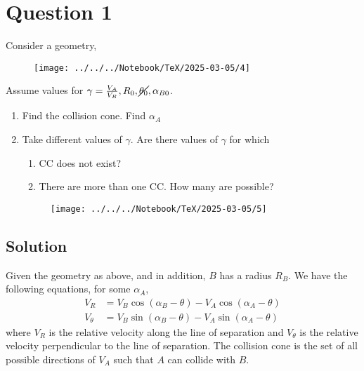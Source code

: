 \section*{Question 1}

Consider a geometry,
\vspace*{-1.5em}
\begin{figure}[htbp]
      \centering
      \texttt{[image: ../../../Notebook/TeX/2025-03-05/4]}
\end{figure}
\vspace*{-1.5em}
Assume values for \( \gamma = \frac{V_A}{V_B}, R_0, \cancel{\theta_0}, \alpha_{B0} \).
\begin{enumerate}[label= (\alph*), noitemsep, topsep=0pt]
      \item Find the collision cone.
            Find \( \alpha_A \)
      \item Take different values of \( \gamma \).
            Are there values of \( \gamma \) for which
            \begin{enumerate}[label= (\alph*), noitemsep, topsep=0pt]
                  \item CC does not exist?
                  \item There are more than one CC.
                        How many are possible?
            \end{enumerate}
            \vspace*{-1.5em}
            \begin{figure}[htbp]
                  \centering
                  \texttt{[image: ../../../Notebook/TeX/2025-03-05/5]}
            \end{figure}
\end{enumerate}

\vspace*{-3em}
\subsection*{Solution}

Given the geometry as above, and in addition, \( B \) has a radius \( R_B \).
We have the following equations, for some \( \alpha_A \),
\begin{align*}
      V_R      & = V_B \cos(\alpha_B - \theta) - V_A \cos(\alpha_A - \theta) \\
      V_\theta & = V_B \sin(\alpha_B - \theta) - V_A \sin(\alpha_A - \theta)
\end{align*}
where \( V_R \) is the relative velocity along the line of separation and \( V_\theta \) is the relative velocity perpendicular to the line of separation.
The collision cone is the set of all possible directions of \( V_A \) such that \( A \) can collide with \( B \).

